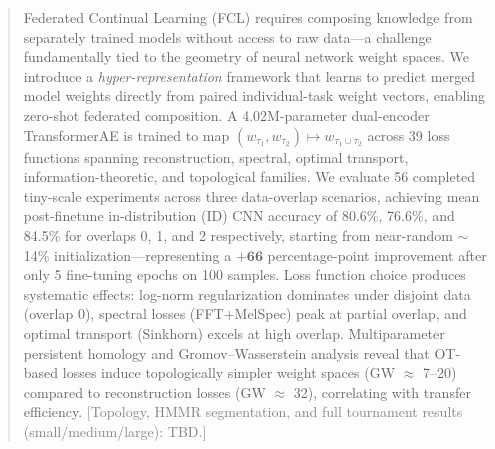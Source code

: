 \begin{abstract}
Federated Continual Learning (FCL) requires composing knowledge from separately trained models without access to raw data---a challenge fundamentally tied to the geometry of neural network weight spaces. We introduce a \emph{hyper-representation} framework that learns to predict merged model weights directly from paired individual-task weight vectors, enabling zero-shot federated composition. A 4.02M-parameter dual-encoder TransformerAE is trained to map $(w_{\tau_1}, w_{\tau_2}) \mapsto w_{\tau_1 \cup \tau_2}$ across 39 loss functions spanning reconstruction, spectral, optimal transport, information-theoretic, and topological families. We evaluate 56 completed tiny-scale experiments across three data-overlap scenarios, achieving mean post-finetune in-distribution (ID) CNN accuracy of 80.6\%, 76.6\%, and 84.5\% for overlaps 0, 1, and 2 respectively, starting from near-random $\sim$14\% initialization---representing a $\mathbf{+66}$ percentage-point improvement after only 5 fine-tuning epochs on 100 samples. Loss function choice produces systematic effects: log-norm regularization dominates under disjoint data (overlap 0), spectral losses (FFT+MelSpec) peak at partial overlap, and optimal transport (Sinkhorn) excels at high overlap. Multiparameter persistent homology and Gromov--Wasserstein analysis reveal that OT-based losses induce topologically simpler weight spaces (GW $\approx$ 7--20) compared to reconstruction losses (GW $\approx$ 32), correlating with transfer efficiency. \textcolor{gray}{[Topology, HMMR segmentation, and full tournament results (small/medium/large): TBD.]}
\end{abstract}